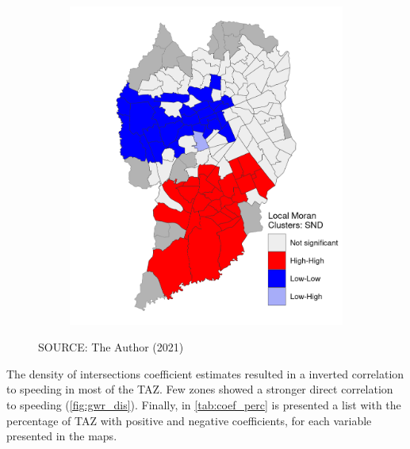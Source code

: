 \begin{figure}[!htbp]
\begin{subfigure}{0.5\textwidth}
        \includegraphics{fig/lisa_SND.png}
    \end{subfigure}    
    \label{fig:gwr_snd}
    \par SOURCE: The Author (2021)
\end{figure}

The density of intersections coefficient estimates resulted in a inverted correlation to speeding in most of the TAZ. Few zones showed a stronger direct correlation to speeding (\autoref{fig:gwr_dis}). Finally, in \autoref{tab:coef_perc} is presented a list with the percentage of TAZ with positive and negative coefficients, for each variable presented in the maps. 

